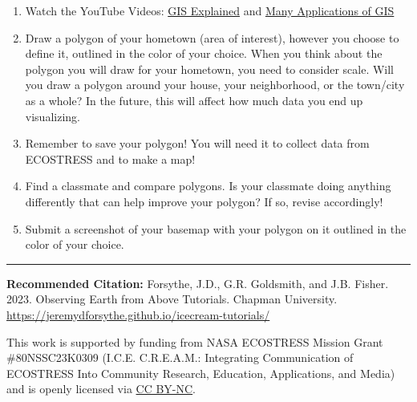 \documentclass[oneside,a4paper,11pt,explicit]{book}
\begin{document}
\begin{tcolorbox}[colback=yellow!5!white,colframe=IceCreamOrbit,title= \vspace{.2em} \Large Make a Map Assignments]
\large
\begin{enumerate}
        
\item Watch the YouTube Videos: \href{https://youtu.be/GplAaU0umOI?si=NRvldDmxYNLF3k4N }{GIS Explained} and \href{https://youtu.be/YsLSGZHWF0c?si=IxLQWydeBMamJvXD}{Many Applications of GIS}

\item Draw a polygon of your hometown (area of interest), however you choose to define it, outlined in the color of your choice. When you think about the polygon you will draw for your hometown, you need to consider scale. Will you draw a polygon around your house, your neighborhood, or the town/city as a whole? In the future, this will affect how much data you end up visualizing.

\item Remember to save your polygon! You will need it to collect data from ECOSTRESS and to make a map! 

\item Find a classmate and compare polygons. Is your classmate doing anything differently that can help improve your polygon? If so, revise accordingly! 

\item Submit a screenshot of your basemap with your polygon on it outlined in the color of your choice.

\end{enumerate}
\end{tcolorbox}
	
	\vfill
	
	\hrule
	
	\vspace{1em}
	
	\textbf{Recommended Citation:} Forsythe, J.D., G.R. Goldsmith, and J.B. Fisher. 2023. Observing Earth from Above Tutorials. Chapman University. \url{https://jeremydforsythe.github.io/icecream-tutorials/}
	
	\vspace{1em}
	
	This work is supported by funding from NASA ECOSTRESS Mission Grant \#80NSSC23K0309 (I.C.E. C.R.E.A.M.: Integrating Communication of ECOSTRESS Into Community Research, Education, Applications, and Media) and is openly licensed via \href{https://creativecommons.org/licenses/by-nc/4.0/}{CC BY-NC}.
	
\end{document}

